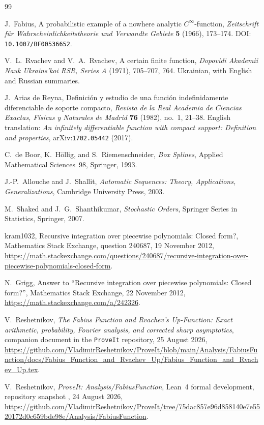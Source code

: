 \documentclass[11pt,oneside]{article}
\theoremstyle{definition}
\theoremstyle{remark}
\begin{document}
\begin{thebibliography}{99}

J.~Fabius,
\newblock A probabilistic example of a nowhere analytic $C^\infty$-function,
\newblock \emph{Zeitschrift für Wahrscheinlichkeitstheorie und Verwandte Gebiete}
  \textbf{5} (1966), 173--174.
\newblock DOI: \nolinkurl{10.1007/BF00536652}.

V.~L.~Rvachev and V.~A.~Rvachev,
\newblock A certain finite function,
\newblock \emph{Dopovidi Akademii Nauk Ukrains'koi RSR, Series A}
  (1971), 705--707, 764.  Ukrainian, with English and Russian summaries.

J.~Arias de Reyna,
\newblock Definición y estudio de una función indefinidamente diferenciable de soporte compacto,
\newblock \emph{Revista de la Real Academia de Ciencias Exactas, Físicas y Naturales de Madrid}
  \textbf{76} (1982), no.~1, 21--38.
\newblock English translation: \emph{An infinitely differentiable function with compact
support: Definition and properties}, arXiv:\nolinkurl{1702.05442} (2017).

C.~de Boor, K.~Höllig, and S.~Riemenschneider,
\newblock \emph{Box Splines},
\newblock Applied Mathematical Sciences~98, Springer, 1993.

J.-P.~Allouche and J.~Shallit,
\newblock \emph{Automatic Sequences: Theory, Applications, Generalizations},
\newblock Cambridge University Press, 2003.

M.~Shaked and J.~G.~Shanthikumar,
\newblock \emph{Stochastic Orders},
\newblock Springer Series in Statistics, Springer, 2007.

kram1032,
\newblock Recursive integration over piecewise polynomials: Closed form?,
\newblock Mathematics Stack Exchange, question 240687, 19 November 2012,
\newblock \url{https://math.stackexchange.com/questions/240687/recursive-integration-over-piecewise-polynomials-closed-form}.

N.~Grigg,
\newblock Answer to ``Recursive integration over piecewise polynomials: Closed form?'',
\newblock Mathematics Stack Exchange, 22 November 2012,
\newblock \url{https://math.stackexchange.com/a/242326}.

V.~Reshetnikov,
\newblock \emph{The Fabius Function and Rvachev's Up-Function: Exact arithmetic,
probability, Fourier analysis, and corrected sharp asymptotics},
\newblock companion document in the \texttt{ProveIt} repository, 25 August 2026,
\newblock \url{https://github.com/VladimirReshetnikov/ProveIt/blob/main/Analysis/FabiusFunction/docs/Fabius_Function_and_Rvachev_Up/Fabius_Function_and_Rvachev_Up.tex}.

V.~Reshetnikov,
\newblock \emph{ProveIt: Analysis/FabiusFunction},
\newblock Lean~4 formal development, repository snapshot
  , 24 August 2026,
\newblock \url{https://github.com/VladimirReshetnikov/ProveIt/tree/75dac857e96d858140e7e5520172d0c659bde98e/Analysis/FabiusFunction}.

\end{thebibliography}
\end{document}
